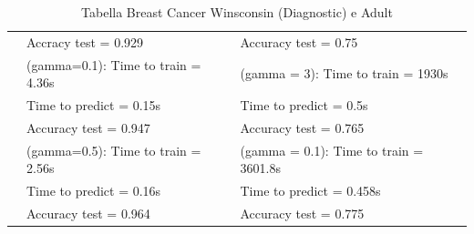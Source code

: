 \documentclass{article}
\begin{document}
\begin{table}[htbp]
\begin{adjustbox}{width=\textwidth}
\begin{tabularx}{\textwidth}{|>{\centering\arraybackslash}X|>{\centering\arraybackslash}X|>{\centering\arraybackslash}X|}
	  & Accracy test = 0.929 & Accuracy test = 0.75\\
	  & (gamma=0.1): Time  to train = 4.36s & (gamma = 3): Time  to train = 1930s\\
	  & Time  to predict = 0.15s & Time  to predict = 0.5s\\
	  & Accuracy test = 0.947 & Accuracy test = 0.765\\
	  & (gamma=0.5): Time  to train = 2.56s & (gamma = 0.1): Time  to train = 3601.8s\\
	  & Time  to predict = 0.16s & Time  to predict = 0.458s\\
	  & Accuracy test = 0.964 & Accuracy test = 0.775\\
	  \hline
	  \end{tabularx}
    \end{adjustbox}
	\caption{Tabella Breast Cancer Winsconsin (Diagnostic) e Adult}
  \end{table}
\end{document}
